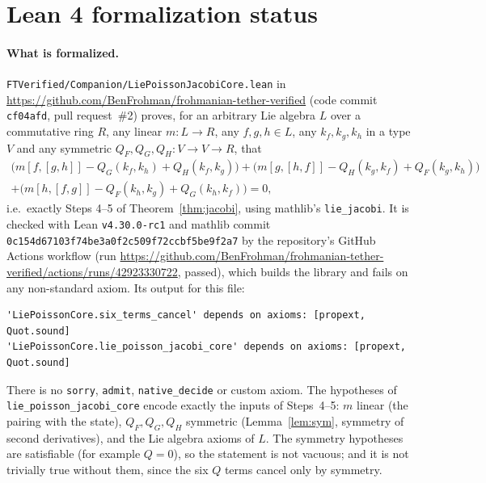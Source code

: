 \documentclass[11pt]{article}
\theoremstyle{definition}
\begin{document}
\section{Lean 4 formalization status}\label{sec:lean}
\paragraph{What is formalized.} \nolinkurl{FTVerified/Companion/LiePoissonJacobiCore.lean} in \url{https://github.com/BenFrohman/frohmanian-tether-verified} (code commit \texttt{cf04afd}, pull request~\#2) proves, for an arbitrary Lie
algebra $L$ over a commutative ring $R$, any linear $m:L\to R$, any $f,g,h\in L$, any $k_f,k_g,k_h$ in a
type $V$ and any symmetric $Q_F,Q_G,Q_H:V\to V\to R$, that
\begin{multline*}
\big(m[f,[g,h]]-Q_G(k_f,k_h)+Q_H(k_f,k_g)\big)+\big(m[g,[h,f]]-Q_H(k_g,k_f)+Q_F(k_g,k_h)\big)\\
+\big(m[h,[f,g]]-Q_F(k_h,k_g)+Q_G(k_h,k_f)\big)=0,
\end{multline*}
i.e.\ exactly Steps 4--5 of Theorem~\ref{thm:jacobi}, using mathlib's \texttt{lie\_jacobi}. It is checked with
Lean \texttt{v4.30.0-rc1} and mathlib commit\\ \texttt{0c154d67103f74be3a0f2c509f72ccbf5be9f2a7} by the repository's
GitHub Actions workflow (run \url{https://github.com/BenFrohman/frohmanian-tether-verified/actions/runs/42923330722},
passed), which builds the library and fails on any non-standard axiom. Its output for this file:
\begin{verbatim}
'LiePoissonCore.six_terms_cancel' depends on axioms: [propext, Quot.sound]
'LiePoissonCore.lie_poisson_jacobi_core' depends on axioms: [propext, Quot.sound]
\end{verbatim}
There is no \texttt{sorry}, \texttt{admit}, \texttt{native\_decide} or custom axiom. The hypotheses of
\nolinkurl{lie_poisson_jacobi_core} encode exactly the inputs of Steps~4--5: $m$ linear (the pairing with the state),
$Q_F,Q_G,Q_H$ symmetric (Lemma~\ref{lem:sym}, symmetry of second derivatives), and the Lie algebra axioms of $L$.
The symmetry hypotheses are satisfiable (for example $Q=0$), so the statement is not vacuous; and it is not
trivially true without them, since the six $Q$ terms cancel only by symmetry.
\end{document}
